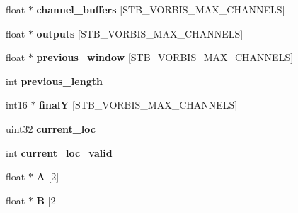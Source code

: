 \begin{DoxyCompactItemize}
\item 
\hypertarget{structstb__vorbis_a55c99dc6b4222ca849a884e9dcef890f}{float $\ast$ {\bfseries channel\-\_\-buffers} \mbox{[}S\-T\-B\-\_\-\-V\-O\-R\-B\-I\-S\-\_\-\-M\-A\-X\-\_\-\-C\-H\-A\-N\-N\-E\-L\-S\mbox{]}}\label{structstb__vorbis_a55c99dc6b4222ca849a884e9dcef890f}

\item 
\hypertarget{structstb__vorbis_aca71a981ab130d51a27b30451ac2ae6f}{float $\ast$ {\bfseries outputs} \mbox{[}S\-T\-B\-\_\-\-V\-O\-R\-B\-I\-S\-\_\-\-M\-A\-X\-\_\-\-C\-H\-A\-N\-N\-E\-L\-S\mbox{]}}\label{structstb__vorbis_aca71a981ab130d51a27b30451ac2ae6f}

\item 
\hypertarget{structstb__vorbis_a00c9f41a45acaa1dfe85a3c02d215728}{float $\ast$ {\bfseries previous\-\_\-window} \mbox{[}S\-T\-B\-\_\-\-V\-O\-R\-B\-I\-S\-\_\-\-M\-A\-X\-\_\-\-C\-H\-A\-N\-N\-E\-L\-S\mbox{]}}\label{structstb__vorbis_a00c9f41a45acaa1dfe85a3c02d215728}

\item 
\hypertarget{structstb__vorbis_a61473d87688517c64ab951538ae1f14f}{int {\bfseries previous\-\_\-length}}\label{structstb__vorbis_a61473d87688517c64ab951538ae1f14f}

\item 
\hypertarget{structstb__vorbis_a70c300d807fef43284883a75ad70e2a4}{int16 $\ast$ {\bfseries final\-Y} \mbox{[}S\-T\-B\-\_\-\-V\-O\-R\-B\-I\-S\-\_\-\-M\-A\-X\-\_\-\-C\-H\-A\-N\-N\-E\-L\-S\mbox{]}}\label{structstb__vorbis_a70c300d807fef43284883a75ad70e2a4}

\item 
\hypertarget{structstb__vorbis_a02d0be708a62def848df1b4c20402983}{uint32 {\bfseries current\-\_\-loc}}\label{structstb__vorbis_a02d0be708a62def848df1b4c20402983}

\item 
\hypertarget{structstb__vorbis_a22ce054c836820c3b8381d6c8fa610ed}{int {\bfseries current\-\_\-loc\-\_\-valid}}\label{structstb__vorbis_a22ce054c836820c3b8381d6c8fa610ed}

\item 
\hypertarget{structstb__vorbis_a1dbabeed4f6505a76789914f16772975}{float $\ast$ {\bfseries A} \mbox{[}2\mbox{]}}\label{structstb__vorbis_a1dbabeed4f6505a76789914f16772975}

\item 
\hypertarget{structstb__vorbis_ad11922956a823e4954c3778b2231fac3}{float $\ast$ {\bfseries B} \mbox{[}2\mbox{]}}\label{structstb__vorbis_ad11922956a823e4954c3778b2231fac3}


\end{DoxyCompactItemize}
